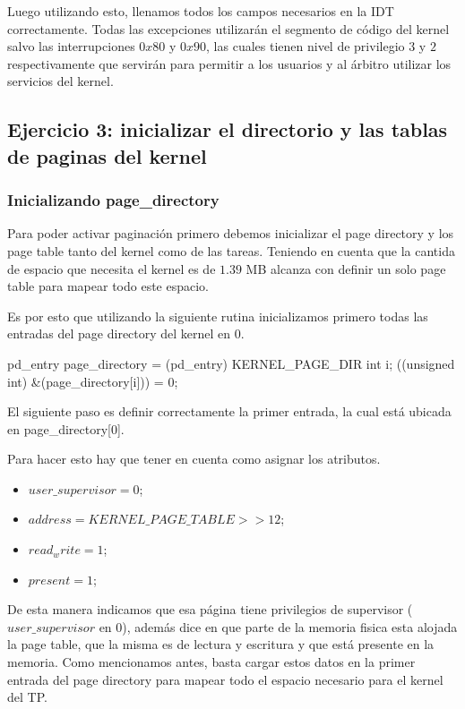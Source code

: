\documentclass[a4paper,10pt,twoside]{article}
\newenvironment{pseudocodigo}
    {\vspace{0.5em} \begin{algorithmic}}
    {\end{algorithmic} \vspace{0.5em}}
\begin{document}
Luego utilizando esto, llenamos todos los campos necesarios en la IDT correctamente. Todas las excepciones utilizarán el segmento de código del kernel salvo las interrupciones $0x80$ y $0x90$, las cuales tienen nivel de privilegio $3$ y $2$ respectivamente que servirán para permitir a los usuarios y al árbitro utilizar los servicios del kernel.


\subsection{Ejercicio 3: inicializar el directorio y las tablas de paginas del kernel}
\subsubsection{Inicializando page\_directory}
Para poder activar paginación primero debemos inicializar el page directory y los page table tanto del kernel como de las tareas. Teniendo en cuenta que la cantida de espacio que necesita el kernel es de $1.39$ MB alcanza con definir un solo page table para mapear todo este espacio.

Es por esto que utilizando la siguiente rutina inicializamos primero todas las entradas del page directory del kernel en $0$.

\begin{pseudocodigo}
  \STATE pd\_entry\* page\_directory = (pd\_entry\*) KERNEL\_PAGE\_DIR
  \STATE int i;
    \STATE \*((unsigned int\*) \&(page\_directory[i])) = 0;
  \ENDFOR
\end{pseudocodigo}

El siguiente paso es definir correctamente la primer entrada, la cual está ubicada en page\_directory[0].

Para hacer esto hay que tener en cuenta como asignar los atributos. 

\begin{itemize}
 \item $user\_supervisor = 0$;
 \item $address = KERNEL\_PAGE\_TABLE >> 12$;
 \item $read_write = 1$;
 \item $present = 1$;
\end{itemize}

De esta manera indicamos que esa página tiene privilegios de supervisor ($user\_supervisor$ en 0), además dice en que parte de la memoria fisica esta alojada la page table, que la misma es de lectura y escritura y que está presente en la memoria.
Como mencionamos antes, basta cargar estos datos en la primer entrada del page directory para mapear todo el espacio necesario para el kernel del TP.
\end{document}
